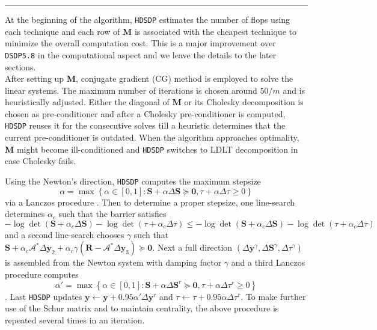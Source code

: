 \noindent\rule{\textwidth}{0.5pt}

At the beginning of the algorithm, {{\texttt{HDSDP}}} estimates the
number of flops using each technique and each row of $\mathbf{M}$ is associated with the cheapest
technique to minimize the overall computation cost. This is a major
improvement over {{\texttt{DSDP5.8}}} in the computational aspect and 
we leave the details to the later sections. \\

After setting up $\mathbf{M}$, conjugate gradient (CG) method is
employed to solve the linear systems. The maximum number of iterations is
chosen around $50 / m$ and is heuristically adjusted. Either the diagonal of
$\mathbf{M}$ or its Cholesky decomposition is chosen as pre-conditioner and
after a Cholesky pre-conditioner is computed, {{\texttt{HDSDP}}} reuses it for 
the consecutive solves till a heuristic determines that the current
pre-conditioner is outdated. When the algorithm approaches optimality, $\mathbf{M}$
might become ill-conditioned and {{\texttt{HDSDP}}} switches to {\textsf{LDLT}} decomposition in case Cholesky fails.

Using the Newton's direction, {{\texttt{HDSDP}}} computes the maximum stepsize
$$\alpha = \max \left\{ \alpha \in [0, 1] : \mathbf{S} + \alpha \Delta \mathbf{S} \succeq \textbf{0},
\tau + \alpha \Delta \tau \geq 0 \right\}$$ via a Lanczos procedure
{\cite{toh2002note}}. Then to determine a proper stepsize, one line-search
determines $\alpha_c$ such that the barrier satisfies $- \log \det \left( \mathbf{S}
+ \alpha_c \Delta \mathbf{S} \right) - \log \det (\tau + \alpha_c \Delta \tau) \leq -
\log \det \left( \mathbf{S} + \alpha_c \Delta \mathbf{S} \right) - \log \det (\tau +
\alpha_c \Delta \tau)$ and a second line-search chooses $\gamma$ such that $\mathbf{S}
+ \alpha_c \mathcal{A}^{\ast} \Delta \mathbf{y}_2 + \alpha_c \gamma \left( \mathbf{R}
-\mathcal{A}^{\ast} \Delta \mathbf{y}_3 \right) \succeq \textbf{0}$. Next a full direction
$\left( \Delta \mathbf{y}^{\gamma}, \Delta \mathbf{S}^{\gamma}, \Delta \tau^{\gamma} \right)$
is assembled from the Newton system with damping factor $\gamma$ and
a third Lanczos procedure computes  \[\alpha' = \max \left\{ \alpha \in [0, 1] :
\mathbf{S} + \alpha \Delta \mathbf{S}^r \succeq \textbf{0}, \tau + \alpha \Delta \tau^r \geq 0
\right\}\]. Last {{\texttt{HDSDP}}} updates $\mathbf{y} \leftarrow \mathbf{y} + 0.95 \alpha'
\Delta \mathbf{y}^r$ and $\tau \leftarrow \tau + 0.95 \alpha \Delta \tau^r$. To make
further use of the Schur matrix and to maintain centrality, the
above procedure is repeated several times in an iteration. \\

